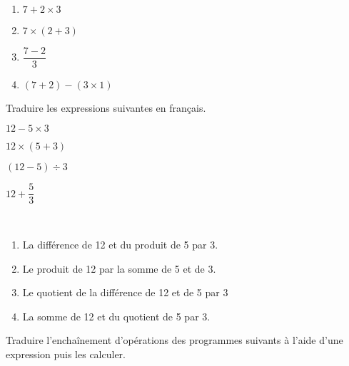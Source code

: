 \begin{colonne*exercice}
\begin{corrige}
   \ \\ [-5mm]
   \begin{enumerate}
      \item \blue $7+2\times3$
      \item \blue $7\times(2+3)$ \smallskip
      \item \blue $\dfrac{7-2}{3}$ \medskip
      \item \blue $(7+2)-(3\times1)$
   \end{enumerate}
\end{corrige}

\bigskip


\begin{exercice}%
   Traduire les expressions suivantes en français.
   \begin{colenumerate}{2}
      \item $12-5\times3$
      \item $12\times(5+3)$
      \item $(12-5)\div3$
      \item $12+\dfrac{5}{3}$
   \end{colenumerate}
\end{exercice}

\begin{corrige}
   \ \\ [-5mm]
   \begin{enumerate}
      \item \blue La différence de 12 et du produit de 5 par 3.
      \item \blue Le produit de 12 par la somme de 5 et de 3.
      \item \blue Le quotient de la différence de 12 et de 5 par 3
      \item \blue La somme de 12 et du quotient de 5 par 3.
   \end{enumerate}
\end{corrige}

\bigskip


\begin{exercice}%
   Traduire l'enchaînement d'opérations des programmes suivants à l'aide d'une expression puis les calculer.
   \begin{multicols}{2}
   \end{multicols}
\end{exercice}


\end{colonne*exercice}
